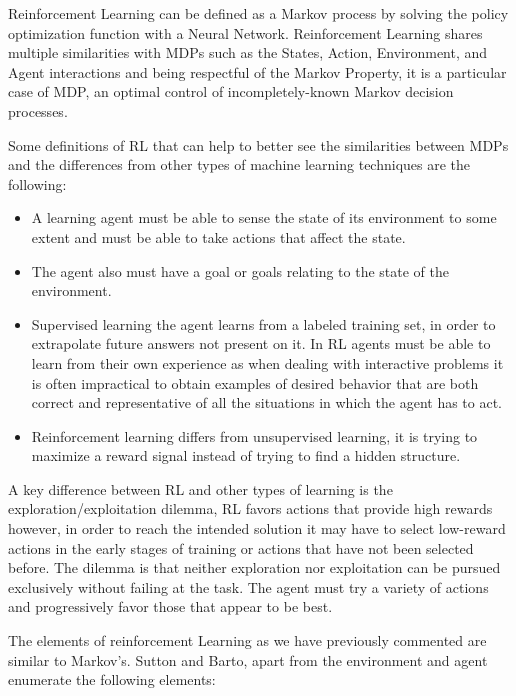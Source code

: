 Reinforcement Learning can be defined as a Markov process by solving the policy optimization function with a Neural Network. Reinforcement Learning shares multiple similarities with MDPs such as the States, Action, Environment, and Agent interactions and being respectful of the Markov Property, it is a particular case of MDP, an optimal control of incompletely-known Markov decision processes\cite{sutton2018reinforcement}.

Some definitions of RL that can help to better see the similarities between MDPs and the differences from other types of machine learning techniques are the following:


\begin{itemize}
    \item A learning agent must be able to sense the state of its environment to some extent and must be able to take actions that affect the state.
    \item The agent also must have a goal or goals relating to the state of the environment.
    \item Supervised learning the agent learns from a labeled training set, in order to extrapolate future answers not present on it. In RL agents must be able to learn from their own experience as when dealing with interactive problems it is often impractical to obtain examples of desired behavior that are both correct and representative of all the situations in which the agent has to act.
    \item Reinforcement learning differs from unsupervised learning, it is trying to maximize a reward signal instead of trying to find a hidden structure.
\end{itemize}

A key difference between RL and other types of learning is the exploration/exploitation dilemma, RL favors actions that provide high rewards however, in order to reach the intended solution it may have to select low-reward actions in the early stages of training or actions that have not been selected before. The dilemma is that neither exploration nor exploitation can be pursued exclusively without failing at the task. The agent must try a variety of actions and progressively favor those that appear to be best.

The elements of reinforcement Learning as we have previously commented are similar to Markov's. Sutton and Barto\cite{}, apart from the environment and agent enumerate the following elements:

